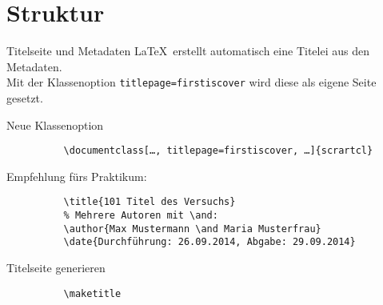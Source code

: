     \section{Struktur}

    \begin{frame}[fragile]{Titelseite und Metadaten}
      \LaTeX\ erstellt automatisch eine Titelei aus den Metadaten. \\
      Mit der Klassenoption \lstinline{titlepage=firstiscover} wird diese  als eigene Seite gesetzt.
      
      \begin{tblock}{Neue Klassenoption}
        \begin{lstlisting}
          \documentclass[…, titlepage=firstiscover, …]{scrartcl}
        \end{lstlisting}
      \end{tblock}

      \begin{tblock}{Empfehlung fürs Praktikum:}
        \begin{lstlisting}
          \title{101 Titel des Versuchs}
          % Mehrere Autoren mit \and:
          \author{Max Mustermann \and Maria Musterfrau}
          \date{Durchführung: 26.09.2014, Abgabe: 29.09.2014}
        \end{lstlisting}
      \end{tblock}

      \begin{tblock}{Titelseite generieren}
        \begin{lstlisting}
          \maketitle
        \end{lstlisting}
      \end{tblock}
    \end{frame}

